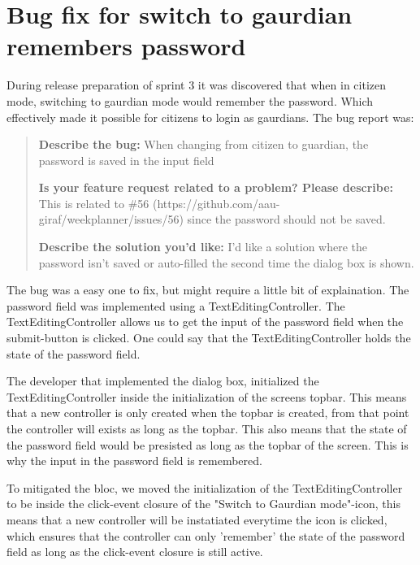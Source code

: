 \section{Bug fix for switch to gaurdian remembers password}
During release preparation of sprint 3 it was discovered that when in citizen mode, switching to gaurdian mode would remember the password. Which effectively made it possible for citizens to login as gaurdians. The bug report was:

\begin{quote}
  \textbf{Describe the bug:} When changing from citizen to guardian, the password is saved in the input field

  \textbf{Is your feature request related to a problem? Please describe:} This is related to \#56 (https://github.com/aau-giraf/weekplanner/issues/56) since the password should not be saved.

  \textbf{Describe the solution you'd like: } I'd like a solution where the password isn't saved or auto-filled the second time the dialog box is shown.
\end{quote}

The bug was a easy one to fix, but might require a little bit of explaination. The password field was implemented using a TextEditingController. The TextEditingController allows us to get the input of the password field when the submit-button is clicked. One could say that the TextEditingController holds the state of the password field.

The developer that implemented the dialog box, initialized the TextEditingController inside the initialization of the screens topbar. This means that a new controller is only created when the topbar is created, from that point the controller will exists as long as the topbar. This also means that the state of the password field would be presisted as long as the topbar of the screen. This is why the input in the password field is remembered.

To mitigated the bloc, we moved the initialization of the TextEditingController to be inside the click-event closure of the "Switch to Gaurdian mode"-icon, this means that a new controller will be instatiated everytime the icon is clicked, which ensures that the controller can only 'remember' the state of the password field as long as the click-event closure is still active.